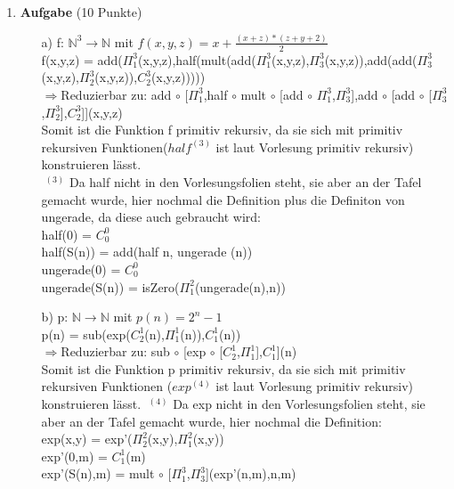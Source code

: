 \documentclass[11pt]{article}
\newcommand{\punkte}[1]{{\small{ }(#1 Punkte)}}
\newcommand{\aufgabe}[1]{\item{\bf #1}}
\begin{document}
\begin{enumerate}
\aufgabe{Aufgabe}\punkte{10}
\begin{itemize}
\item[a)]f: $\mathbb{N}^3 \rightarrow \mathbb{N}$ mit $f(x,y,z) = x + \frac{(x+z) * (z+y+2)}{2}$\\
\newline
f(x,y,z) = add($\Pi_1^3$(x,y,z),half(mult(add($\Pi_1^3$(x,y,z),$\Pi_3^3$(x,y,z)),add(add($\Pi_3^3$(x,y,z),$\Pi_2^3$(x,y,z)),$C_2^3$(x,y,z)))))\\
\newline
$\Rightarrow$Reduzierbar zu: add $\circ$ [$\Pi_1^3$,half $\circ$ mult $\circ$ [add $\circ$ $\Pi_1^3$,$\Pi_3^3$],add $\circ$ [add $\circ$ [$\Pi_3^3$,$\Pi_2^3$],$C_2^3$]](x,y,z)\\
Somit ist die Funktion f primitiv rekursiv, da sie sich mit primitiv rekursiven Funktionen($half^{(3)}$ ist laut Vorlesung primitiv rekursiv) konstruieren lässt.\\
\newline
$\phantom{.}^{(3)}$ Da half nicht in den Vorlesungsfolien steht, sie aber an der Tafel gemacht wurde, hier nochmal die Definition plus die Definiton von ungerade, da diese auch gebraucht wird:\\
\newline
half(0) = $C_0^0$\\
half(S(n)) = add(half n, ungerade (n))\\
\newline
ungerade(0) = $C_0^0$\\
ungerade(S(n)) = isZero($\Pi_1^2$(ungerade(n),n))\\
\newpage

\item[b)]p: $\mathbb{N} \rightarrow \mathbb{N}$ mit $p(n) = 2^n - 1$\\
\newline
p(n) = sub(exp($C_2^1$(n),$\Pi_1^1$(n)),$C_1^1$(n))\\
\newline
$\Rightarrow$Reduzierbar zu: sub $\circ$ [exp $\circ$ [$C_2^1$,$\Pi_1^1$],$C_1^1$](n)\\
Somit ist die Funktion p primitiv rekursiv, da sie sich mit primitiv rekursiven Funktionen ($exp^{(4)}$ ist laut Vorlesung primitiv rekursiv) konstruieren lässt.
\newline
$\phantom{.}^{(4)}$ Da exp nicht in den Vorlesungsfolien steht, sie aber an der Tafel gemacht wurde, hier nochmal die Definition:\\
exp(x,y) = exp'($\Pi_2^2$(x,y),$\Pi_1^2$(x,y))\\
\newline
exp'(0,m) = $C_1^1$(m)\\
exp'(S(n),m) = mult $\circ$ [$\Pi_1^3$,$\Pi_3^3$](exp'(n,m),n,m)\\


\end{itemize}
\end{enumerate}
\end{document}

